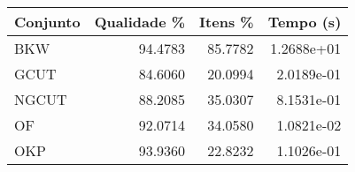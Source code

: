 \begin{tabular}{lrrr}
    \hline
    Conjunto & Qualidade \% & Itens \% & Tempo (s)  \\
    \hline
    BKW      & 94.4783      & 85.7782  & 1.2688e+01 \\
    GCUT     & 84.6060      & 20.0994  & 2.0189e-01 \\
    NGCUT    & 88.2085      & 35.0307  & 8.1531e-01 \\
    OF       & 92.0714      & 34.0580  & 1.0821e-02 \\
    OKP      & 93.9360      & 22.8232  & 1.1026e-01 \\
    \hline
\end{tabular}
